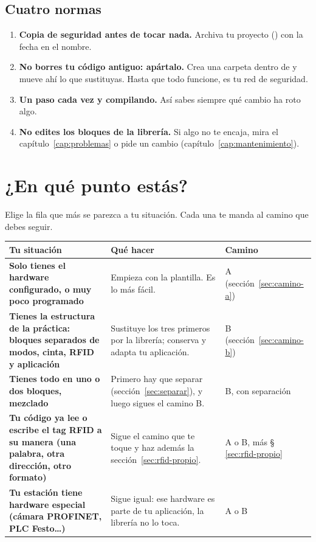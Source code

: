 \subsection{Cuatro normas}
\begin{enumerate}[leftmargin=1.2cm,label=\textbf{N\arabic*.}]
\item \textbf{Copia de seguridad antes de tocar nada.} Archiva tu proyecto () con la fecha en el nombre.
\item \textbf{No borres tu código antiguo: apártalo.} Crea una carpeta  dentro de  y mueve ahí lo que sustituyas. Hasta que todo funcione, es tu red de seguridad.
\item \textbf{Un paso cada vez y compilando.} Así sabes siempre qué cambio ha roto algo.
\item \textbf{No edites los bloques de la librería.} Si algo no te encaja, mira el capítulo~\ref{cap:problemas} o pide un cambio (capítulo~\ref{cap:mantenimiento}).
\end{enumerate}

\section{¿En qué punto estás?}\label{sec:punto}
Elige la fila que más se parezca a tu situación. Cada una te manda al camino que debes seguir.

\begin{center}
\small
\begin{tabularx}{\textwidth}{>{\bfseries}p{4.1cm}Xp{2.0cm}}
\toprule
Tu situación & Qué hacer & Camino \\
\midrule
Solo tienes el hardware configurado, o muy poco programado & Empieza con la plantilla. Es lo más fácil. & A (sección~\ref{sec:camino-a}) \\
Tienes la estructura de la práctica: bloques separados de modos, cinta, RFID y aplicación & Sustituye los tres primeros por la librería; conserva y adapta tu aplicación. & B (sección~\ref{sec:camino-b}) \\
Tienes todo en uno o dos bloques, mezclado & Primero hay que separar (sección~\ref{sec:separar}), y luego sigues el camino B. & B, con separación \\
Tu código ya lee o escribe el tag RFID a su manera (una palabra, otra dirección, otro formato) & Sigue el camino que te toque y haz además la sección~\ref{sec:rfid-propio}. & A o B, más \S\,\ref{sec:rfid-propio} \\
Tu estación tiene hardware especial (cámara PROFINET, PLC Festo…) & Sigue igual: ese hardware es parte de tu aplicación, la librería no lo toca. & A o B \\
\bottomrule
\end{tabularx}
\end{center}

